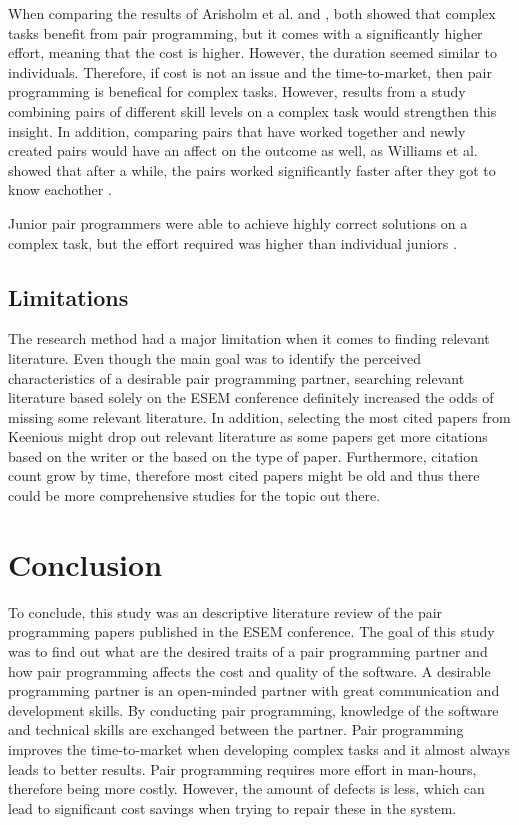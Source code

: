 \documentclass[conference]{IEEEtran}
\begin{document}
When comparing the results of Arisholm et al. \cite{Arisholm2007Evaluating} and \cite{10.1145/1159733.1159749}, both showed that complex tasks benefit from pair programming, but it comes with a significantly higher effort, meaning that the cost is higher. However, the duration seemed similar to individuals. Therefore, if cost is not an issue and the time-to-market, then pair programming is benefical for complex tasks. However, results from a study combining pairs of different skill levels on a complex task would strengthen this insight. In addition, comparing pairs that have worked together and newly created pairs would have an affect on the outcome as well, as Williams et al. showed that after a while, the pairs worked significantly faster after they got to know eachother \cite{Williams2000Strengthening}.

Junior pair programmers were able to achieve highly correct solutions on a complex task, but the effort required was higher than individual juniors \cite{Arisholm2007Evaluating}.

\subsection{Limitations}

The research method had a major limitation when it comes to finding relevant literature. Even though the main goal was to identify the perceived characteristics of a desirable pair programming partner, searching relevant literature based solely on the ESEM conference definitely increased the odds of missing some relevant literature. In addition, selecting the most cited papers from Keenious might drop out relevant literature as some papers get more citations based on the writer or the based on the type of paper. Furthermore, citation count grow by time, therefore most cited papers might be old and thus there could be more comprehensive studies for the topic out there.

\section{Conclusion}

To conclude, this study was an descriptive literature review of the pair programming papers published in the ESEM conference. The goal of this study was to find out what are the desired traits of a pair programming partner and how pair programming affects the cost and quality of the software. A desirable programming partner is an open-minded partner with great communication and development skills. By conducting pair programming, knowledge of the software and technical skills are exchanged between the partner. Pair programming improves the time-to-market when developing complex tasks and it almost always leads to better results. Pair programming requires more effort in man-hours, therefore being more costly. However, the amount of defects is less, which can lead to significant cost savings when trying to repair these in the system. 






\end{document}
